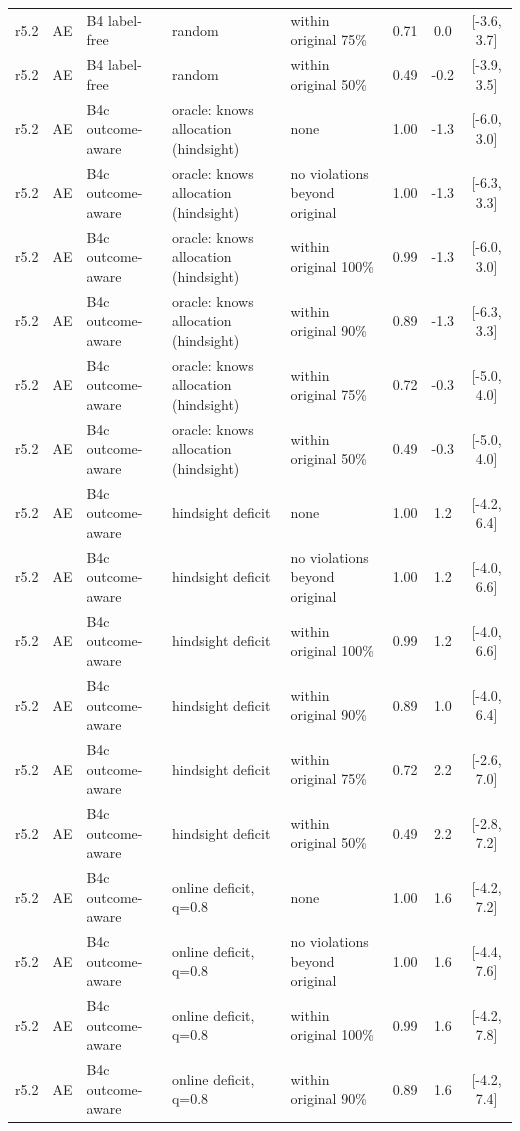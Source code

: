 \documentclass[10pt,onecolumn,letterpaper]{article}
\begin{document}
\begin{longtable}{lllp{4.2cm}p{3.4cm}ccc}
r5.2 & AE & B4 label-free & random & within original 75\% & 0.71 & 0.0 & [-3.6, 3.7] \\
r5.2 & AE & B4 label-free & random & within original 50\% & 0.49 & -0.2 & [-3.9, 3.5] \\
r5.2 & AE & B4c outcome-aware & oracle: knows allocation (hindsight) & none & 1.00 & -1.3 & [-6.0, 3.0] \\
r5.2 & AE & B4c outcome-aware & oracle: knows allocation (hindsight) & no violations beyond original & 1.00 & -1.3 & [-6.3, 3.3] \\
r5.2 & AE & B4c outcome-aware & oracle: knows allocation (hindsight) & within original 100\% & 0.99 & -1.3 & [-6.0, 3.0] \\
r5.2 & AE & B4c outcome-aware & oracle: knows allocation (hindsight) & within original 90\% & 0.89 & -1.3 & [-6.3, 3.3] \\
r5.2 & AE & B4c outcome-aware & oracle: knows allocation (hindsight) & within original 75\% & 0.72 & -0.3 & [-5.0, 4.0] \\
r5.2 & AE & B4c outcome-aware & oracle: knows allocation (hindsight) & within original 50\% & 0.49 & -0.3 & [-5.0, 4.0] \\
r5.2 & AE & B4c outcome-aware & hindsight deficit & none & 1.00 & 1.2 & [-4.2, 6.4] \\
r5.2 & AE & B4c outcome-aware & hindsight deficit & no violations beyond original & 1.00 & 1.2 & [-4.0, 6.6] \\
r5.2 & AE & B4c outcome-aware & hindsight deficit & within original 100\% & 0.99 & 1.2 & [-4.0, 6.6] \\
r5.2 & AE & B4c outcome-aware & hindsight deficit & within original 90\% & 0.89 & 1.0 & [-4.0, 6.4] \\
r5.2 & AE & B4c outcome-aware & hindsight deficit & within original 75\% & 0.72 & 2.2 & [-2.6, 7.0] \\
r5.2 & AE & B4c outcome-aware & hindsight deficit & within original 50\% & 0.49 & 2.2 & [-2.8, 7.2] \\
r5.2 & AE & B4c outcome-aware & online deficit, q=0.8 & none & 1.00 & 1.6 & [-4.2, 7.2] \\
r5.2 & AE & B4c outcome-aware & online deficit, q=0.8 & no violations beyond original & 1.00 & 1.6 & [-4.4, 7.6] \\
r5.2 & AE & B4c outcome-aware & online deficit, q=0.8 & within original 100\% & 0.99 & 1.6 & [-4.2, 7.8] \\
r5.2 & AE & B4c outcome-aware & online deficit, q=0.8 & within original 90\% & 0.89 & 1.6 & [-4.2, 7.4] \\

\end{longtable}
\end{document}
